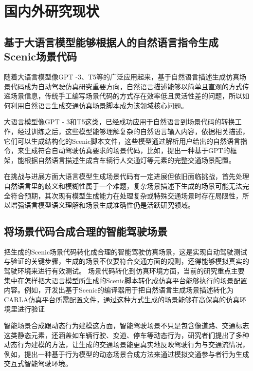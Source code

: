 \section{国内外研究现状}
\subsection{基于大语言模型能够根据人的自然语言指令生成Scenic场景代码}
随着大语言模型像GPT -3、T5等的广泛应用起来，基于自然语言描述生成仿真场景代码成为自动驾驶仿真研究重要方向，自然语言描述能够以简单且直观的方式传递场景信息\cite{klischat2020scenario}，传统手工编写场景代码的方式存在效率低且灵活性差的问题，所以如何利用自然语言生成交通仿真场景脚本成为该领域核心问题。

大语言模型像GPT - 3和T5这类\cite{Xu2023DriveGPT4}，已经成功应用于自然语言到场景代码的转换工作，经过训练之后，这些模型能够理解复杂的自然语言输入内容，依据相关描述，它们可以生成结构化的Scenic脚本文件\cite{scenario_runner_contributors2019carla}，这些模型通过解析用户给出的自然语言指令，来生成符合自动驾驶仿真要求的场景代码，比如，提出一种基于GPT的框架，能根据自然语言描述生成含车辆行人交通灯等元素的完整交通场景配置。

在挑战与进展方面大语言模型生成场景代码有一定进展但依旧面临挑战，首先处理自然语言里的歧义和模糊性属于一个难题，复杂场景描述下生成的场景可能无法完全符合预期，其次现有模型生成能力在处理复杂或特殊交通场景时存在局限性，所以增强语言模型语义理解和场景生成准确性仍是活跃研究领域。

\subsection{将场景代码合成合理的智能驾驶场景}
把生成的Scenic场景代码转化成合理的智能驾驶仿真场景\cite{wu2025complexscenes}，这是实现自动驾驶测试与验证的关键步骤，生成的场景不仅要符合交通方面的规则，还得能够模拟真实的驾驶环境来进行有效测试。
场景代码转化到仿真环境方面\cite{gu2025reinforcementlearning}，当前的研究重点主要集中在怎样把大语言模型所生成的Scenic脚本转化成仿真平台能够执行的场景配置内容。例如，开发出基于Scenic的编译器用于把自然语言生成场景描述转化为CARLA仿真平台所需配置文件，通过这种方式生成的场景能够在高保真的仿真环境里进行验证

智能场景合成跟动态行为建模这方面，智能驾驶场景不只是包含像道路、交通标志这类静态元素，还涵盖如车辆行驶、变道、停车等动态行为，研究者们提出了多种动态行为建模的方法，让生成的交通场景能更真实地反映驾驶行为与交通流情况\cite{wu2025taxi}，例如，提出一种基于行为模型的动态场景合成方法来通过模拟交通参与者行为生成交互式智能驾驶环境。

